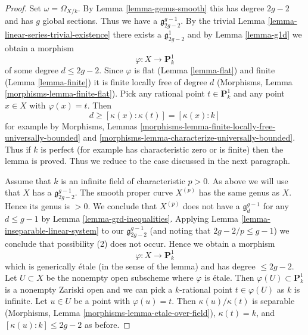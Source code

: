 \documentclass[10pt,a4paper]{amsart}
\theoremstyle{plain}
\theoremstyle{definition}
\theoremstyle{remark}
\numberwithin{equation}{subsection}
\begin{document}
\begin{proof}
Set $\omega = \Omega_{X/k}$. By
Lemma \ref{lemma-genus-smooth} this has degree $2g - 2$
and has $g$ global sections. Thus we have a $\mathfrak g^{g - 1}_{2g - 2}$.
By the trivial Lemma \ref{lemma-linear-series-trivial-existence}
there exists a $\mathfrak g^1_{2g - 2}$
and by Lemma \ref{lemma-g1d} we obtain a morphism
$$
\varphi : X \longrightarrow \mathbf{P}^1_k
$$
of some degree $d \leq 2g - 2$. Since $\varphi$ is flat
(Lemma \ref{lemma-flat}) and finite
(Lemma \ref{lemma-finite})
it is finite locally free of degree $d$
(Morphisms, Lemma \ref{morphisms-lemma-finite-flat}).
Pick any rational point $t \in \mathbf{P}^1_k$
and any point $x \in X$ with $\varphi(x) = t$.
Then
$$
d \geq [\kappa(x) : \kappa(t)] = [\kappa(x) : k]
$$
for example by
Morphisms, Lemmas \ref{morphisms-lemma-finite-locally-free-universally-bounded}
and \ref{morphisms-lemma-characterize-universally-bounded}.
Thus if $k$ is perfect (for example has characteristic zero
or is finite) then the lemma is proved. Thus we reduce to the
case discussed in the next paragraph.

\medskip\noindent
Assume that $k$ is an infinite field of characteristic $p > 0$.
As above we will use that $X$ has a $\mathfrak g^{g - 1}_{2g - 2}$.
The smooth proper curve $X^{(p)}$ has the same genus as $X$.
Hence its genus is $> 0$. We conclude that $X^{(p)}$ does not have a
$\mathfrak g^{g - 1}_d$ for any $d \leq g - 1$ by
Lemma \ref{lemma-grd-inequalities}.
Applying Lemma \ref{lemma-inseparable-linear-system}
to our $\mathfrak g^{g - 1}_{2g - 2}$ (and noting that $2g - 2/p \leq g - 1$)
we conclude that possibility (2) does not occur. Hence we obtain a morphism
$$
\varphi : X \longrightarrow \mathbf{P}^1_k
$$
which is generically \'etale (in the sense of the lemma)
and has degree $\leq 2g - 2$. Let $U \subset X$ be the nonempty
open subscheme where $\varphi$ is \'etale. Then
$\varphi(U) \subset \mathbf{P}^1_k$ is a nonempty Zariski open
and we can pick a $k$-rational point $t \in \varphi(U)$ as $k$ is infinite.
Let $u \in U$ be a point with $\varphi(u) = t$.
Then $\kappa(u)/\kappa(t)$ is separable
(Morphisms, Lemma \ref{morphisms-lemma-etale-over-field}),
$\kappa(t) = k$, and $[\kappa(u) : k] \leq 2g - 2$ as before.
\end{proof}
\end{document}

